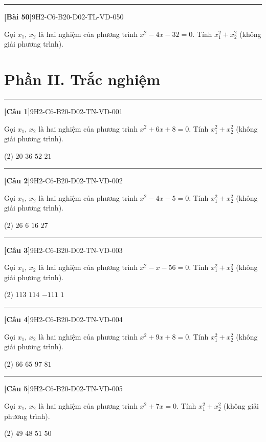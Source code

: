 \documentclass[12pt,a4paper]{article}
\newif\ifloigiai
\newenvironment{cauhoi}[2]{%
  \par\medskip\noindent\rule{\textwidth}{0.4pt}\par\nopagebreak
  \noindent\textbf{[#1]}\hfill{\scriptsize\ttfamily #2}\par\nopagebreak\smallskip}{\par}
\newcommand{\loigiai}[1]{\ifloigiai\par\smallskip\noindent\textit{Lời giải.} #1\par\fi}
\newcommand{\dapan}[1]{\ifloigiai\par\smallskip\noindent\textit{Đáp án:} \textbf{#1}\par\fi}
\begin{document}
\begin{cauhoi}{Bài 50}{9H2-C6-B20-D02-TL-VD-050}
Gọi $x_1$, $x_2$ là hai nghiệm của phương trình $x^{2}-4x-32=0$. Tính $x_1^{2}+x_2^{2}$ (không giải phương trình).
\loigiai{Theo định lí Viète: $x_1+x_2=4$, $x_1x_2=-32$. Suy ra $x_1^{2}+x_2^{2}=(x_1+x_2)^{2}-2x_1x_2=4^{2}-2\cdot(-32)=80$.}
\end{cauhoi}
\clearpage\section*{Phần II. Trắc nghiệm}
\begin{cauhoi}{Câu 1}{9H2-C6-B20-D02-TN-VD-001}
Gọi $x_1$, $x_2$ là hai nghiệm của phương trình $x^{2}+6x+8=0$. Tính $x_1^{2}+x_2^{2}$ (không giải phương trình).
\begin{tasks}(2)
\task $20$
\task $36$
\task $52$
\task $21$
\end{tasks}
\dapan{A}
\end{cauhoi}
\begin{cauhoi}{Câu 2}{9H2-C6-B20-D02-TN-VD-002}
Gọi $x_1$, $x_2$ là hai nghiệm của phương trình $x^{2}-4x-5=0$. Tính $x_1^{2}+x_2^{2}$ (không giải phương trình).
\begin{tasks}(2)
\task $26$
\task $6$
\task $16$
\task $27$
\end{tasks}
\dapan{A}
\end{cauhoi}
\begin{cauhoi}{Câu 3}{9H2-C6-B20-D02-TN-VD-003}
Gọi $x_1$, $x_2$ là hai nghiệm của phương trình $x^{2}-x-56=0$. Tính $x_1^{2}+x_2^{2}$ (không giải phương trình).
\begin{tasks}(2)
\task $113$
\task $114$
\task $-111$
\task $1$
\end{tasks}
\dapan{A}
\end{cauhoi}
\begin{cauhoi}{Câu 4}{9H2-C6-B20-D02-TN-VD-004}
Gọi $x_1$, $x_2$ là hai nghiệm của phương trình $x^{2}+9x+8=0$. Tính $x_1^{2}+x_2^{2}$ (không giải phương trình).
\begin{tasks}(2)
\task $66$
\task $65$
\task $97$
\task $81$
\end{tasks}
\dapan{B}
\end{cauhoi}
\begin{cauhoi}{Câu 5}{9H2-C6-B20-D02-TN-VD-005}
Gọi $x_1$, $x_2$ là hai nghiệm của phương trình $x^{2}+7x=0$. Tính $x_1^{2}+x_2^{2}$ (không giải phương trình).
\begin{tasks}(2)
\task $49$
\task $48$
\task $51$
\task $50$
\end{tasks}
\dapan{A}
\end{cauhoi}
\end{document}
